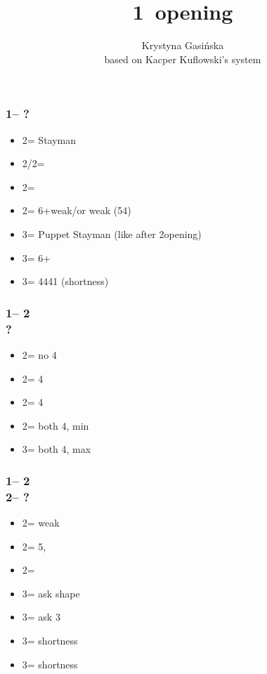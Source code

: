 \documentclass[12pt, a4paper]{article}
\title{1\ntx\ opening}
\author{Krystyna Gasińska\\based on Kacper Kuflowski's system}
\begin{document}
\maketitle


\subsubsection*{1\nt -- ?}
\begin{itemize}
    \item 2\clubs = Stayman
    \item 2\diams/2\hearts = \then \major
    \item 2\spades = \then \clubs
    \item 2\nt = 6+\diams weak/\gf or \minor weak (54)
    \item 3\clubs = Puppet Stayman (like after 2\nt opening) \imp
    \item 3\diams = 6+\diams\ \inv
    \item 3\major = 4441 (\major shortness) \gf \qq
\end{itemize}

\subsubsection*{1\nt -- 2\clubs\\
                ?}
\begin{itemize}
    \item 2\diams = no 4\major
    \item 2\hearts = 4\hearts
    \item 2\spades = 4\spades
    \item 2\nt = both 4\major, min
    \item 3\clubs = both 4\major, max
\end{itemize}

\subsubsection*{1\nt -- 2\clubs\\
                2\diams -- ?}
\begin{itemize}
    \item 2\hearts = \major weak
    \item 2\spades = 5\spades, \inv
    \item 2\nt = \inv
    \item 3\clubs = ask shape
    \item 3\diams = ask 3\major
    \item 3\hearts = \clubs shortness
    \item 3\spades = \diams shortness
\end{itemize}
\end{document}
